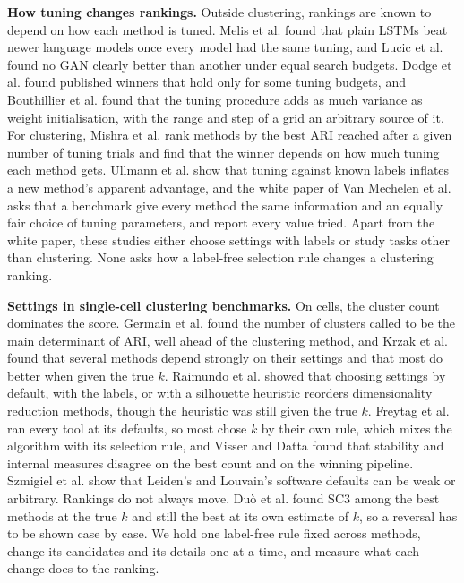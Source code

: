 \textbf{How tuning changes rankings.} Outside clustering, rankings are known to depend on how each
method is tuned. Melis et al. \cite{melis2018state} found that plain LSTMs beat newer language models
once every model had the same tuning, and Lucic et al. \cite{lucic2018gans} found no GAN clearly better
than another under equal search budgets. Dodge et al. \cite{dodge2019show} found published winners that
hold only for some tuning budgets, and Bouthillier et al. \cite{bouthillier2021accounting} found that the
tuning procedure adds as much variance as weight initialisation, with the range and step of a grid an
arbitrary source of it. For clustering, Mishra et al. \cite{mishra2022evaluative} rank methods by the
best ARI reached after a given number of tuning trials and find that the winner depends on how much
tuning each method gets. Ullmann et al. \cite{ullmann2023overoptimistic} show that tuning against known
labels inflates a new method's apparent advantage, and the white paper of Van Mechelen et al.
\cite{vanmechelen2023white} asks that a benchmark give every method the same information and an equally
fair choice of tuning parameters, and report every value tried. Apart from the white paper, these studies either choose settings with labels or study tasks other than clustering. None asks how a label-free selection rule changes a clustering
ranking.

\textbf{Settings in single-cell clustering benchmarks.} On cells, the cluster count dominates the score.
Germain et al. \cite{germain2020pipecomp} found the number of clusters called to be the main determinant
of ARI, well ahead of the clustering method, and Krzak et al. \cite{krzak2019benchmark} found that
several methods depend strongly on their settings and that most do better when given the true $k$.
Raimundo et al. \cite{raimundo2020tuning} showed that choosing settings by default, with the labels, or
with a silhouette heuristic reorders dimensionality reduction methods, though the heuristic was still
given the true $k$. Freytag et al. \cite{freytag2018comparison} ran every tool at its defaults, so most chose $k$ by their own rule,
which mixes the algorithm with its selection rule, and Visser and Datta \cite{visser2025integrating}
found that stability and internal measures disagree on the best count and on the winning pipeline.
Szmigiel et al. \cite{szmigiel2025benchmarking} show that Leiden's and Louvain's software defaults can be
weak or arbitrary. Rankings do not always move. Du{\`o} et al. \cite{duo2018systematic} found SC3 among the best methods at the true $k$ and still the best at its own estimate of $k$, so a reversal has to be shown case by case. We hold one label-free rule fixed across methods, change its candidates and its details
one at a time, and measure what each change does to the ranking.

